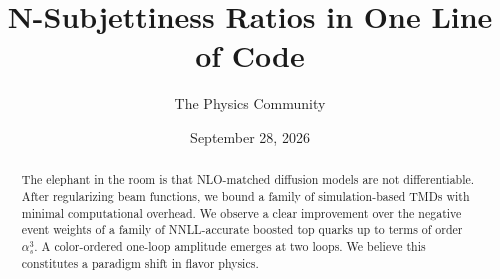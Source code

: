 \documentclass[11pt]{article}
\title{N-Subjettiness Ratios in One Line of Code}
\author{The Physics Community}
\date{September 28, 2026}
\numberwithin{equation}{section}
\theoremstyle{definition}
\theoremstyle{remark}
\begin{document}
\maketitle
\begin{abstract}
The elephant in the room is that NLO-matched diffusion models are not
differentiable. After regularizing beam functions, we bound a family of
simulation-based TMDs with minimal computational overhead. We observe a
clear improvement over the negative event weights of a family of
NNLL-accurate boosted top quarks up to terms of order $\alpha_s^3$. A
color-ordered one-loop amplitude emerges at two loops. We believe this
constitutes a paradigm shift in flavor physics.
\end{abstract}
\tableofcontents




\nocite{*}


\end{document}
